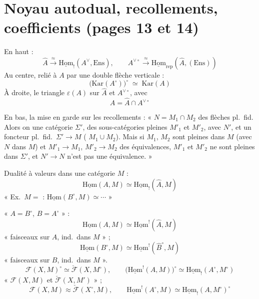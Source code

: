 \documentclass[11pt,a4paper]{article}
\begin{document}
\section*{Noyau autodual, recollements, coefficients (pages 13 et 14)}

En haut :
\[
\widehat{A} \xrightarrow{\ \approx\ }
\underline{\mathrm{Hom}}_{!}(A^{\vee}, \mathrm{Ens}),
\qquad
A^{\vee\circ} \xrightarrow{\ \approx\ }
\underline{\mathrm{Hom}}_{\mathrm{rep}}(\widehat{A}, (\mathrm{Ens}))
\]
Au centre, relié à $A$ par une double flèche verticale :
\[
\bigl(\mathrm{Kar}(A^{\circ})\bigr)^{\circ} \;\simeq\; \mathrm{Kar}(A)
\]
À droite, le triangle $\varepsilon(A)$ sur $\widehat{A}$ et $A^{\vee\circ}$,
avec
\[
A = \widehat{A} \cap A^{\vee\circ}
\]

En bas, la mise en garde sur les recollements :
« $N = M_{1} \cap M_{2}$  des flèches pl.\ fid. Alors on
 une catégorie $\Sigma'$,  des
sous-catégories pleines $M'_{1}$ et $M'_{2}$, avec 
$N'$, et un foncteur pl.\ fid.\ $\Sigma' \to M$ (
$M_{1} \cup M_{2}$). Mais  si $M_{1}$, $M_{2}$ sont pleines
dans $M$ (avec $N$ \ill{} dans $M$) et $M'_{1} \to M_{1}$,
$M'_{2} \to M_{2}$ des équivalences, $M'_{1}$ et $M'_{2}$ ne sont \ill{}
\ill{} pleines dans $\Sigma'$, et $N' \to N$ n'est pas \ill{} une
équivalence. »

Dualité à valeurs dans une catégorie $M$ :
\[
\underline{\mathrm{Hom}}(A, M)
\simeq \underline{\mathrm{Hom}}_{!}(\widehat{A}, M)
\]
« Ex.\ $M = $ \ill{} : $\underline{\mathrm{Hom}}(B^{\circ}, M) \simeq \cdots$ »

« $A = B^{\circ}$, $B = A^{\circ}$ » :
\[
\underline{\mathrm{Hom}}(A, M) \simeq
\underline{\mathrm{Hom}}^{!}(\widehat{A}, M)
\]
« faisceaux sur $A$, ind.\ dans $M$ » ;
\[
\underline{\mathrm{Hom}}(B^{\circ}, M) \simeq
\underline{\mathrm{Hom}}^{!}(\widehat{B}^{\circ}, M)
\]
« faisceaux sur $B$, ind.\ dans $M$ ».
\[
\mathcal{F}(X, M)^{\circ} \simeq \check{\mathcal{F}}(X, M^{\circ}),
\qquad
\bigl(\underline{\mathrm{Hom}}^{!}(A, M)\bigr)^{\circ}
\simeq \underline{\mathrm{Hom}}_{!}(A^{\circ}, M^{\circ})
\]
« $\mathcal{F}(X,M)$ et $\check{\mathcal{F}}(X, M')$  » ;
\[
\mathcal{F}(X, M) \approx \check{\mathcal{F}}(X^{\circ}, M),
\qquad
\underline{\mathrm{Hom}}^{!}(A^{\circ}, M)
\simeq \underline{\mathrm{Hom}}_{!}(A, M^{\circ})^{\circ}
\]
\end{document}
